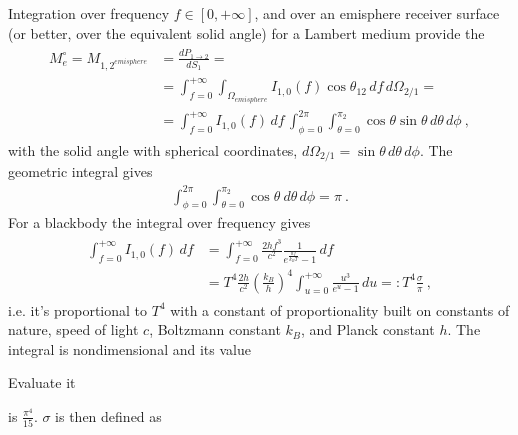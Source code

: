 \documentclass[letterpaper,10pt,english]{jupyterBook}
\begin{document}
\sphinxAtStartPar
Integration over frequency \(f \in [0, +\infty]\), and over an emisphere receiver surface (or better, over the equivalent solid angle) for a Lambert medium provide the 
\begin{equation*}
\begin{split}\begin{aligned}
  M_{e}^\circ = M_{1,2^{emisphere}}
  & = \frac{d P_{1 \rightarrow 2}}{d S_1} = \\
  & = \int_{f=0}^{+\infty} \int_{\Omega_{emisphere}} I_{1,0}(f) \cos \theta_{12} \, df \, d\Omega_{2/1} = \\
  & = \int_{f=0}^{+\infty}I_{1,0}(f) \, df \, \int_{\phi = 0}^{2\pi} \int_{\theta=0}^{\pi_2} \cos \theta \sin \theta \, d \theta \, d\phi \ ,
\end{aligned}\end{split}
\end{equation*}
\sphinxAtStartPar
with the solid angle with spherical coordinates, \(d\Omega_{2/1} = \sin \theta \, d \theta \, d\phi\). The geometric integral gives
\begin{equation*}
\begin{split}
  \int_{\phi = 0}^{2\pi} \int_{\theta=0}^{\pi_2} \cos \theta_{} \, d \theta \, d\phi = \pi \ .
\end{split}
\end{equation*}
\sphinxAtStartPar
For a black\sphinxhyphen{}body the integral over frequency gives
\begin{equation*}
\begin{split}\begin{aligned}
  \int_{f = 0}^{+\infty} I_{1,0}(f) \, df
  & = \int_{f=0}^{+\infty} \frac{2 h f^3}{c^2} \frac{1}{e^{\frac{hf}{k_B T}}-1} \, df \\
  & = T^4 \frac{2 h}{c^2} \left(\frac{k_B}{h}\right)^4 \int_{u=0}^{+\infty} \frac{u^3}{e^u-1} \, du =: T^4 \frac{\sigma}{\pi} \ ,
\end{aligned}\end{split}
\end{equation*}
\sphinxAtStartPar
i.e. it’s proportional to \(T^4\) with a constant of proportionality built on constants of nature, speed of light \(c\), Boltzmann constant \(k_B\), and Planck constant \(h\). The integral is non\sphinxhyphen{}dimensional and its value%
\begin{footnote}[2]\sphinxAtStartFootnote
{} Evaluate it
%
\end{footnote} is \(\frac{\pi^4}{15}\).  \(\sigma\) is then defined as
\end{document}
